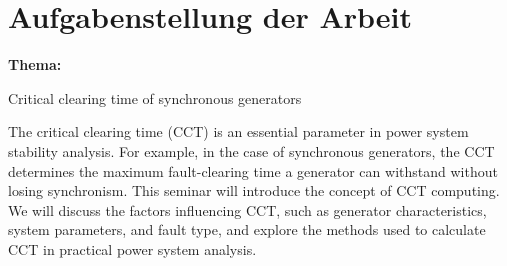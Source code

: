 \chapter*{Aufgabenstellung der Arbeit}
\thispagestyle{plain.scrheadings}
{\large \textbf{Thema:} \parbox[t]{0.8\textwidth}{Critical clearing time of synchronous generators}}
\newline

The critical clearing time (CCT) is an essential parameter in power system stability
analysis. For example, in the case of synchronous generators, the CCT determines the
maximum fault-clearing time a generator can withstand without losing synchronism.
This seminar will introduce the concept of CCT computing. We will discuss the factors
influencing CCT, such as generator characteristics, system parameters, and fault type,
and explore the methods used to calculate CCT in practical power system analysis.
